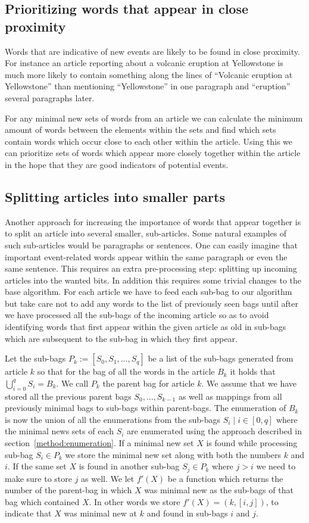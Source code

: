 \subsection{Prioritizing words that appear in close proximity}
Words that are indicative of new events are likely to be found in close proximity. For instance an article reporting about a volcanic eruption at Yellowstone is much more likely to contain something along the lines of ``Volcanic eruption at Yellowstone'' than mentioning ``Yellowstone'' in one paragraph and ``eruption'' several paragraphs later.

For any minimal new sets of words from an article we can calculate the minimum amount of words between the elements within the sets and find which sets contain words which occur close to each other within the article. Using this we can prioritize sets of words which appear more closely together within the article in the hope that they are good indicators of potential events.

\subsection{Splitting articles into smaller parts}
Another approach for increasing the importance of words that appear together is to split an article into several smaller, sub-articles. Some natural examples of such sub-articles would be paragraphs or sentences. One can easily imagine that important event-related words appear within the same paragraph or even the same sentence. This requires an extra pre-processing step: splitting up incoming articles into the wanted bits. In addition this requires some trivial changes to the base algorithm. For each article we have to feed each sub-bag to our algorithm but take care not to add any words to the list of previously seen bags until after we have processed all the sub-bags of the incoming article so as to avoid identifying words that first appear within the given article as old in sub-bags which are subsequent to the sub-bag in which they first appear.

Let the sub-bags $P_{k} := [S_{0}, S_{1},...,S_{q}]$ be a list of the sub-bags generated from article $k$ so that for the bag of all the words in the article $B_{k}$ it holds that $\bigcup_{i=0}^{q}S_{i} = B_{k}$. We call $P_{k}$ the parent bag for article $k$. We assume that we have stored all the previous parent bags $S_{0},...,S_{k-1}$ as well as mappings from all previously minimal bags to sub-bags within parent-bags. The enumeration of $B_{k}$ is now the union of all the enumerations from the sub-bags $S_{i} \mid i \in [0,q]$ where the minimal news sets of each $S_{i}$ are enumerated using the approach described in section~\ref{method:enumeration}. If a minimal new set $X$ is found while processing sub-bag $S_{i} \in P_{k}$ we store the minimal new set along with both the numbers $k$ and $i$. If the same set $X$ is found in another sub-bag $S_{j} \in P_{k}$ where $j>i$ we need to make sure to store $j$ as well. We let $f'(X)$ be a function which returns the number of the  parent-bag in which $X$ was minimal new as the sub-bags of that bag which contained $X$. In other words we store $f'(X) = (k, [i,j])$, to indicate that $X$ was minimal new at $k$ and found in sub-bags $i$ and $j$. 

